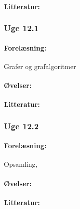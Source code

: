 \documentclass[12pt]{article}
\begin{document}
\paragraph{Litteratur:}

\subsubsection{Uge 12.1}
\paragraph{Forelæsning:} 
Grafer og grafalgoritmer
\paragraph{Øvelser:}
\paragraph{Litteratur:}
\subsubsection{Uge 12.2}
\paragraph{Forelæsning:} 
Opsamling, 
\paragraph{Øvelser:}
\paragraph{Litteratur:}
\end{document}
